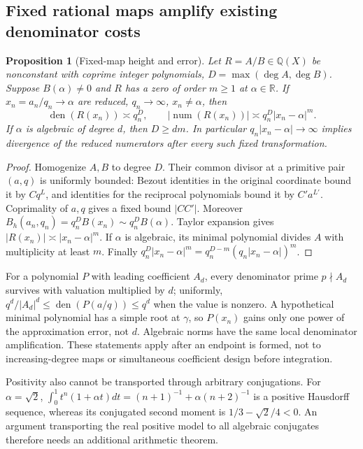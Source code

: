 \documentclass[11pt,a4paper]{article}
\newcommand{\Q}{\mathbb Q}
\newcommand{\R}{\mathbb R}
\newtheorem{proposition}[theorem]{Proposition}
\theoremstyle{definition}
\theoremstyle{remark}
\numberwithin{equation}{section}
\begin{document}
\subsection{Fixed rational maps amplify existing denominator costs}
\begin{proposition}[Fixed-map height and error]
\label{ar:rationalmap}
Let $R=A/B\in\Q(X)$ be nonconstant with coprime integer polynomials,
$D=\max(\deg A,\deg B)$.  Suppose $B(\alpha)\ne0$ and $R$ has a zero
of order $m\ge1$ at $\alpha\in\R$.  If $x_n=a_n/q_n\to\alpha$ are
reduced, $q_n\to\infty$, $x_n\ne\alpha$, then
\[
 \operatorname{den}(R(x_n))\asymp q_n^D,\qquad
 |\operatorname{num}(R(x_n))|\asymp q_n^D|x_n-\alpha|^m.
\]
If $\alpha$ is algebraic of degree $d$, then $D\ge dm$.
In particular $q_n|x_n-\alpha|\to\infty$ implies divergence of the
reduced numerators after every such fixed transformation.
\end{proposition}
\begin{proof}
Homogenize $A,B$ to degree $D$.  Their common divisor at a primitive pair
$(a,q)$ is uniformly bounded: Bezout identities in the original coordinate
bound it by $Cq^L$, and identities for the reciprocal polynomials bound it
by $C'a^{L'}$.  Coprimality of $a,q$ gives a fixed bound $|CC'|$.
Moreover $B_h(a_n,q_n)=q_n^DB(x_n)\sim q_n^DB(\alpha)$.
Taylor expansion gives $|R(x_n)|\asymp|x_n-\alpha|^m$.  If $\alpha$ is
algebraic, its minimal polynomial divides $A$ with multiplicity at least
$m$.  Finally $q_n^D|x_n-\alpha|^m=
q_n^{D-m}(q_n|x_n-\alpha|)^m$.
\end{proof}
For a polynomial $P$ with leading coefficient $A_d$, every denominator
prime $p\nmid A_d$ survives with valuation multiplied by $d$; uniformly,
$q^d/|A_d|^d\le\operatorname{den}(P(a/q))\le q^d$ when the value is
nonzero.  A hypothetical minimal polynomial has a simple root at $\gamma$,
so $P(x_n)$ gains only one power of the approximation error, not $d$.
Algebraic norms have the same local denominator amplification.  These
statements apply after an endpoint is formed, not to increasing-degree
maps or simultaneous coefficient design before integration.

Positivity also cannot be transported through arbitrary conjugations.
For $\alpha=\sqrt2$,
$\int_0^1t^n(1+\alpha t)dt=(n+1)^{-1}+\alpha(n+2)^{-1}$ is a positive
Hausdorff sequence, whereas its conjugated second moment is
$1/3-\sqrt2/4<0$.  An argument transporting the real positive model to
all algebraic conjugates therefore needs an additional arithmetic theorem.
\end{document}
